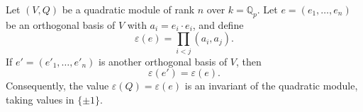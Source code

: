 Let $(V, Q)$ be a quadratic module of rank $n$ over $k = \mathbb{Q}_p$. Let $e = (e_1, \ldots, e_n)$ be an orthogonal basis of $V$ with $a_i = e_i \cdot e_i$, and define
$$\varepsilon(e) = \prod_{i < j} (a_i, a_j).$$
If $e' = (e'_1, \ldots, e'_n)$ is another orthogonal basis of $V$, then
$$\varepsilon(e') = \varepsilon(e).$$
Consequently, the value $\varepsilon(Q) = \varepsilon(e)$ is an invariant of the quadratic module, taking values in $\{\pm 1\}$.
